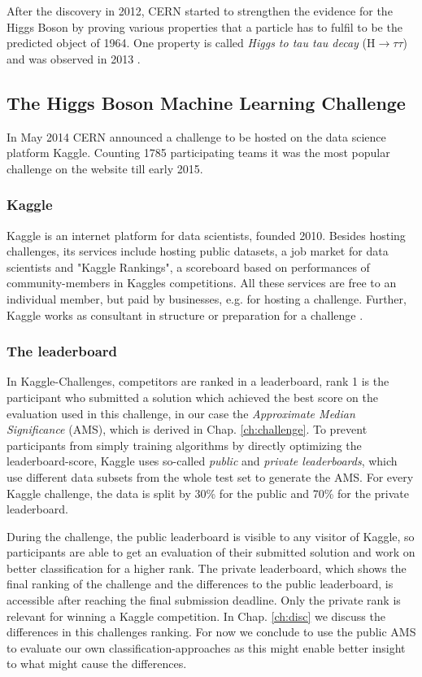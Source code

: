 After the discovery in 2012, CERN started to strengthen the evidence for the Higgs Boson by proving various properties that a particle has to fulfil to be the predicted object of 1964. One property is called \emph{Higgs to tau tau decay} ($\mathrm{H}\rightarrow\tau\tau $) and was observed in 2013 \cite{atlasNote}.

\subsection{The Higgs Boson Machine Learning Challenge}
In May 2014 CERN announced a challenge to be hosted on the data science platform Kaggle. Counting 1785 participating teams it was the most popular challenge on the website till early 2015.

\subsubsection{Kaggle}
Kaggle is an internet platform for data scientists, founded 2010. Besides hosting challenges, its services include hosting public datasets, a job market for data scientists and "Kaggle Rankings", a scoreboard based on performances of community-members in Kaggles competitions. All these services are free to an individual member, but paid by businesses, e.g. for hosting a challenge. Further, Kaggle works as consultant in structure or preparation for a challenge \cite{kaggle}.

\subsubsection{The leaderboard}\label{sec:lb}
In Kaggle-Challenges, competitors are ranked in a leaderboard, rank 1 is the participant who submitted a solution which achieved the best score on the evaluation used in this challenge, in our case the \emph{Approximate Median Significance} (AMS), which is derived in Chap. \ref{ch:challenge}. To prevent participants from simply training algorithms by directly optimizing the leaderboard-score, Kaggle uses so-called \emph{public} and \emph{private leaderboards}, which use different data subsets from the whole test set to generate the AMS. For every Kaggle challenge, the data is split by 30\% for the public and 70\% for the private leaderboard.

During the challenge, the public leaderboard is visible to any visitor of Kaggle, so participants are able to get an evaluation of their submitted solution and work on better classification for a higher rank.
The private leaderboard, which shows the final ranking of the challenge and the differences to the public leaderboard, is accessible after reaching the final submission deadline. Only the private rank is relevant for winning a Kaggle competition. In Chap. \ref{ch:disc} we discuss the differences in this challenges ranking. For now we conclude to use the public AMS to evaluate our own classification-approaches as this might enable better insight to what might cause the differences.

